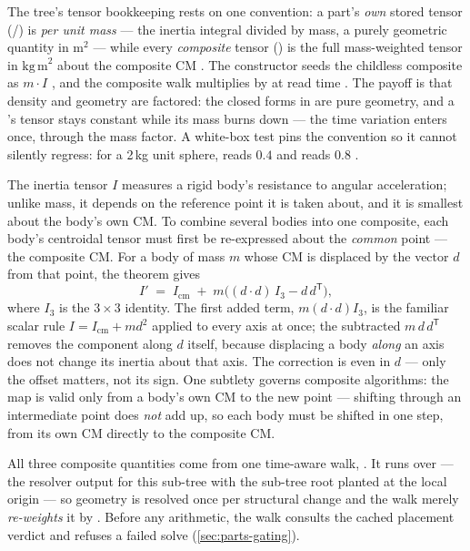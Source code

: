 The tree's tensor bookkeeping rests on one convention: a part's \emph{own} stored tensor
(/) is
\emph{per unit mass} --- the inertia integral divided by mass, a purely geometric quantity in
$\mathrm{m}^2$ --- while every \emph{composite} tensor () is the full
mass-weighted tensor in $\mathrm{kg\,m}^2$ about the composite CM
. The constructor seeds the childless composite as $m \cdot I$
, and the composite walk multiplies by  at
read time . The payoff is that density and geometry are
factored: the closed forms in  are pure geometry, and a 's
tensor stays constant while its mass burns down --- the time variation enters once, through
the mass factor. A white-box test pins the convention so it cannot silently regress: for a
2\,kg unit sphere,  reads $0.4$ and  reads $0.8$
.

\begin{physbox}
The inertia tensor $I$ measures a rigid body's resistance to angular acceleration; unlike
mass, it depends on the reference point it is taken about, and it is smallest about the
body's own CM. To combine several bodies into one composite, each body's centroidal tensor
must first be re-expressed about the \emph{common} point --- the composite CM. For a body of
mass $m$ whose CM is displaced by the vector $d$ from that point, the theorem gives
\begin{equation*}
I' \;=\; I_{\mathrm{cm}} \;+\; m\big((d \cdot d)\,I_3 - d\,d^{\mathsf{T}}\big),
\end{equation*}
where $I_3$ is the $3\times 3$ identity. The first added term, $m(d \cdot d)I_3$, is the
familiar scalar rule $I = I_{\mathrm{cm}} + m d^2$ applied to every axis at once; the
subtracted $m\,d\,d^{\mathsf{T}}$ removes the component along $d$ itself, because displacing a
body \emph{along} an axis does not change its inertia about that axis. The correction is even
in $d$ --- only the offset matters, not its sign. One subtlety governs composite algorithms:
the map is valid only from a body's own CM to the new point --- shifting through an
intermediate point does \emph{not} add up, so each body must be shifted in one step, from its
own CM directly to the composite CM.
\end{physbox}

All three composite quantities come from one time-aware walk,
 . It runs over
 --- the resolver output for this sub-tree with the sub-tree root planted
at the local origin  --- so geometry is resolved once per
structural change and the walk merely \emph{re-weights} it by 
. Before any arithmetic, the walk consults the cached placement
verdict and refuses a failed solve (\cref{sec:parts-gating}).

